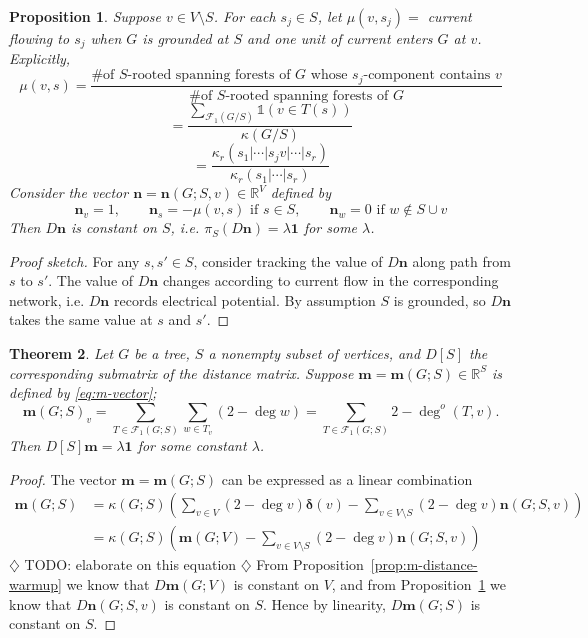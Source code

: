 \documentclass{amsart}
\newtheorem{thm}{Theorem}
\newtheorem{prop}[thm]{Proposition}
\theoremstyle{definition}
\newcommand{\RR}{\mathbb{R}}
\newcommand{\bone}{\mathbf{1}}
\newcommand{\bolddelta}{\bm{\delta}}
\newcommand{\boldm}{\mathbf{m}}
\newcommand{\boldn}{\mathbf{n}}
\newcommand{\trees}{\mathcal{F}_1}
\newcommand{\degout}{\deg^o}
\newcommand{\note}[1]{{\color{red} \sf $\diamondsuit$  {#1} $\diamondsuit$ }}
\begin{document}
\begin{prop}
\label{prop:n-vector}
Suppose $v \in V \setminus S$.
For each $s_j \in S$, let $\mu(v,s_j) = $ current flowing to $s_j$
when 
$G$ is grounded at $S$
and 
one unit of current enters $G$ at $v$.
Explicitly,
\begin{equation*}
\mu(v,s) =  \frac{\text{\# of $S$-rooted spanning forests of $G$ whose $s_j$-component contains $v$}}{\text{\# of $S$-rooted spanning forests of $G$}}
\end{equation*}
\[
= \frac{\sum_{\trees(G/S)} \mathds{1}(v \in T(s))}{\kappa(G/S)}
\]
\[
= \frac{\kappa_{r}(s_1|\cdots|s_j v| \cdots|s_r)}{\kappa_r(s_1|\cdots|s_r)}
\]
Consider the vector $\mathbf{n} = \mathbf{n}(G;S,v) \in \RR^V$ defined by
\[
	\mathbf{n}_v = 1,\qquad
	\mathbf{n}_s = -\mu(v,s) \text{ if }s \in S, \qquad
	\mathbf{n}_w = 0 \text{ if } w \not\in S \cup v
\]
Then $D\mathbf{n}$ is constant on $S$, i.e. $\pi_S( D \mathbf{n}) = \lambda \mathbf{1}$ for some $\lambda$.
\end{prop}
\begin{proof}[Proof sketch]
For any $s, s' \in S$, consider tracking the value of $D \mathbf{n}$ along path from $s$ to $s'$. 
The value of $D \mathbf{n}$ changes according to current flow in the corresponding network, i.e. $D \mathbf{n}$ records electrical potential.
By assumption $S$ is grounded, so $D\mathbf{n}$ takes the same value at $s$ and $s'$.
\end{proof}

\begin{thm}
Let $G$ be a tree, $S$ a nonempty subset of vertices,
and $D[S]$ the corresponding submatrix of the distance matrix.
Suppose $\boldm = \boldm(G;S) \in \RR^{S}$ is defined by \eqref{eq:m-vector};
\begin{equation}
\boldm(G;S)_v = \sum_{T \in \trees(G;S)} \sum_{w \in T_v} (2 - \deg w) 
= \sum_{T \in \trees(G;S)} 2 - \degout(T,v) .
\end{equation}
Then $D[S] \boldm = \lambda \bone$
for some constant $\lambda$.
\end{thm}
\begin{proof}
The vector $\boldm = \boldm(G;S)$ can be expressed as a linear combination
\begin{align}
	\boldm (G;S)
	&= \kappa(G;S) \left( \sum_{v \in V}(2 - \deg v) {\bolddelta}(v) 
	- \sum_{v \in V \setminus S} (2 - \deg v) \mathbf{n}(G;S,v) 
	\right) \\
	&= \kappa(G;S) \left( \boldm(G;V) - \sum_{v\in V\setminus S} (2 - \deg v) \boldn(G;S,v) \right)
\end{align}
\note{TODO: elaborate on this equation}
From Proposition~\ref{prop:m-distance-warmup} we know that $D \boldm(G;V)$ is constant on $V$,
and from Proposition~\ref{prop:n-vector} we know that $D \boldn(G;S,v)$ is constant on $S$.
Hence by linearity, $D \boldm(G;S)$ is constant on $S$.
\end{proof}
\end{document}
